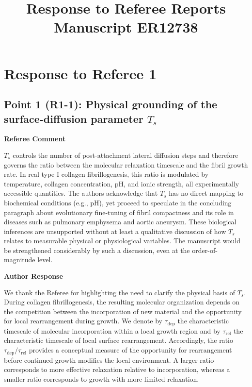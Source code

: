 \documentclass[11pt]{article}
\title{\textbf{Response to Referee Reports}\\[0.35em]
  \large Manuscript ER12738}
\author{}
\date{}
\newenvironment{refereecomment}
  {%
    \par
    \begingroup
    \color{commentgray}
    \itshape
    \setlength{\leftskip}{1.4em}
    \setlength{\rightskip}{1.4em}
  }
  {%
    \par
    \endgroup
  }
\newcommand{\refereelabel}{%
  \par\smallskip
  {\color{commentgray}\bfseries Referee Comment}\par
}
\newcommand{\responselabel}{%
  \par\medskip
  {\color{responseblue}\bfseries Author Response}\par
}
\begin{document}
\maketitle
\vspace{-2.5em}

\section*{Response to Referee 1}

\subsection*{Point 1 (R1-1): Physical grounding of the surface-diffusion parameter \(T_s\)}

\refereelabel
\begin{refereecomment}
\(T_s\) controls the number of post-attachment lateral diffusion steps and
therefore governs the ratio between the molecular relaxation timescale and the
fibril growth rate. In real type I collagen fibrillogenesis, this ratio is
modulated by temperature, collagen concentration, pH, and ionic strength, all
experimentally accessible quantities. The authors acknowledge that \(T_s\) has
no direct mapping to biochemical conditions (e.g., pH), yet proceed to
speculate in the concluding paragraph about evolutionary fine-tuning of fibril
compactness and its role in diseases such as pulmonary emphysema and aortic
aneurysm. These biological inferences are unsupported without at least a
qualitative discussion of how \(T_s\) relates to measurable physical or
physiological variables. The manuscript would be strengthened considerably by
such a discussion, even at the order-of-magnitude level.
\end{refereecomment}

\responselabel
We thank the Referee for highlighting the need to clarify the physical basis
of \(T_s\). During collagen fibrillogenesis, the resulting molecular
organization depends on the competition between the incorporation of new
material and the opportunity for local rearrangement during growth. We denote
by \(\tau_{\mathrm{dep}}\) the characteristic timescale of molecular
incorporation within a local growth region and by
\(\tau_{\mathrm{rel}}\) the characteristic timescale of local surface
rearrangement. Accordingly, the ratio
\(\tau_{\mathrm{dep}}/\tau_{\mathrm{rel}}\) provides a conceptual measure of
the opportunity for rearrangement before continued growth modifies the local
environment. A larger ratio corresponds to more effective relaxation relative
to incorporation, whereas a smaller ratio corresponds to growth with more
limited relaxation.
\end{document}
